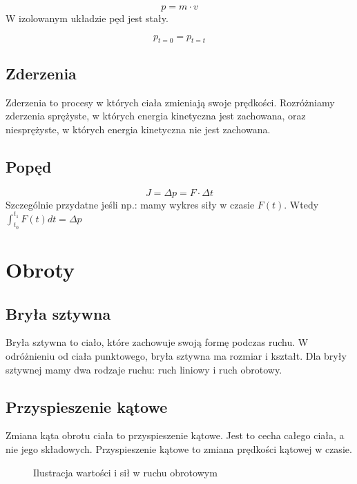 \documentclass{../notatki}
\begin{document}
$$
p = m \cdot v
$$
W izolowanym układzie pęd jest stały.

$$
p_{t=0} = p_{t=t}
$$

\subsection{Zderzenia}

Zderzenia to procesy w których ciała zmieniają swoje prędkości. Rozróżniamy
zderzenia sprężyste, w których energia kinetyczna jest zachowana, oraz
niesprężyste, w których energia kinetyczna nie jest zachowana.

\subsection{Popęd}

$$
J = \Delta p = F \cdot \Delta t
$$
Szczególnie przydatne jeśli np.: mamy wykres siły w czasie $F(t)$. Wtedy
$\int^{t_1}_{t_0} F(t) dt = \Delta p$

\section{Obroty}

\subsection{Bryła sztywna}

Bryła sztywna to ciało, które zachowuje swoją formę podczas ruchu. W odróżnieniu
od ciała punktowego, bryła sztywna ma rozmiar i kształt. Dla bryły sztywnej
mamy dwa rodzaje ruchu: ruch liniowy i ruch obrotowy.

\subsection{Przyspieszenie kątowe}

Zmiana kąta obrotu ciała to przyspieszenie kątowe. Jest to cecha całego ciała,
a nie jego składowych. Przyspieszenie kątowe to zmiana prędkości kątowej
w czasie.
\begin{figure*}[ht]
  \centering
  \caption{Ilustracja wartości i sił w ruchu obrotowym}
\end{figure*}
\end{document}
